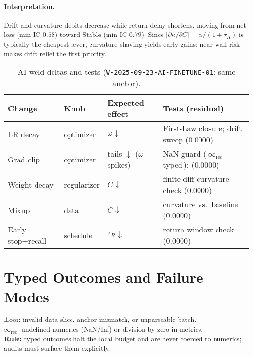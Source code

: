 \paragraph{Interpretation.}
Drift and curvature debits decrease while return delay shortens, moving from net loss (min IC \(0.58\)) toward Stable (min IC \(0.79\)). Since \(|\partial\kappa/\partial C|=\alpha/(1+\tau_R)\) is typically the cheapest lever, curvature shaving yields early gains; near-wall risk makes drift relief the first priority.
\begin{table}[h]
  \centering
  \caption{AI weld deltas and tests (\texttt{W-2025-09-23-AI-FINETUNE-01}; same anchor).}
  \label{tab:ai-weld-deltas}
  \footnotesize
  \begingroup
  \setlength{\tabcolsep}{4pt}
  \begin{tabularx}{\linewidth}{@{} l l l >{\raggedright\arraybackslash}X @{}}
    \toprule
    Change & Knob & Expected effect & Tests (residual) \\
    \midrule
    LR decay & optimizer & $\omega\downarrow$ & First-Law closure; drift sweep (0.0000) \\
    Grad clip & optimizer & tails $\downarrow$ ($\omega$ spikes) & NaN guard (\,$\infty_{\mathrm{rec}}$ typed\,); (0.0000) \\
    Weight decay & regularizer & $C\downarrow$ & finite-diff curvature check (0.0000) \\
    Mixup & data & $C\downarrow$ & curvature vs.\ baseline (0.0000) \\
    Early-stop+recall & schedule & $\tau_R\downarrow$ & return window check (0.0000) \\
    \bottomrule
  \end{tabularx}
  \endgroup
\end{table}

\section{Typed Outcomes and Failure Modes}
\label{sec:ai-typed}

\begin{eqbox}
$\bot\!\mathrm{oor}$: invalid data slice, anchor mismatch, or unparseable batch. \\
$\infty_{\mathrm{rec}}$: undefined numerics (NaN/Inf) or division-by-zero in metrics. \\
\textbf{Rule:} typed outcomes halt the local budget and are never coerced to numerics; audits must surface them explicitly.
\end{eqbox}


